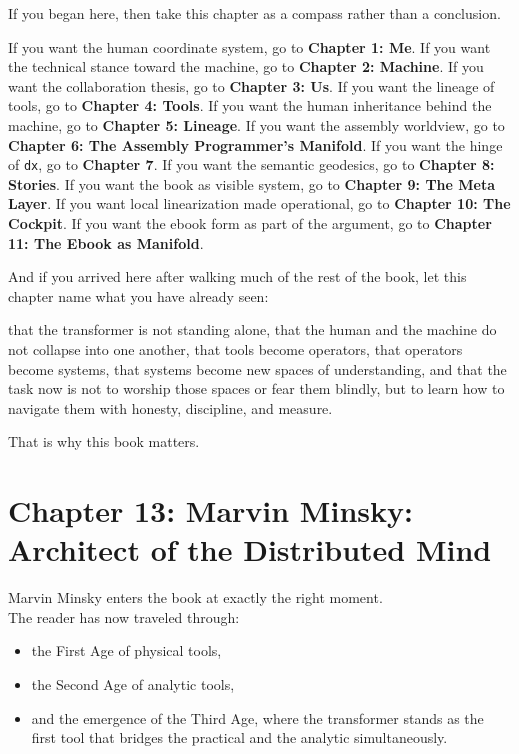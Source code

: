 If you began here, then take this chapter as a compass rather than a
conclusion.

If you want the human coordinate system, go to \textbf{Chapter 1: Me}.
If you want the technical stance toward the machine, go to
\textbf{Chapter 2: Machine}. If you want the collaboration thesis, go to
\textbf{Chapter 3: Us}. If you want the lineage of tools, go to
\textbf{Chapter 4: Tools}. If you want the human inheritance behind the
machine, go to \textbf{Chapter 5: Lineage}. If you want the assembly
worldview, go to \textbf{Chapter 6: The Assembly Programmer's Manifold}.
If you want the hinge of \texttt{dx}, go to \textbf{Chapter 7}. If you
want the semantic geodesics, go to \textbf{Chapter 8: Stories}. If you
want the book as visible system, go to \textbf{Chapter 9: The Meta
Layer}. If you want local linearization made operational, go to
\textbf{Chapter 10: The Cockpit}. If you want the ebook form as part of
the argument, go to \textbf{Chapter 11: The Ebook as Manifold}.

And if you arrived here after walking much of the rest of the book, let
this chapter name what you have already seen:

that the transformer is not standing alone, that the human and the
machine do not collapse into one another, that tools become operators,
that operators become systems, that systems become new spaces of
understanding, and that the task now is not to worship those spaces or
fear them blindly, but to learn how to navigate them with honesty,
discipline, and measure.

That is why this book matters.

\newpage
\vspace*{3cm}

\hypertarget{chapter-13-marvin-minsky-architect-of-the-distributed-mind}{%
\section{Chapter 13: Marvin Minsky: Architect of the Distributed
Mind}\label{chapter-13-marvin-minsky-architect-of-the-distributed-mind}}

Marvin Minsky enters the book at exactly the right moment.\\
The reader has now traveled through:

\begin{itemize}
\tightlist
\item
  the First Age of physical tools,
\item
  the Second Age of analytic tools,
\item
  and the emergence of the Third Age, where the transformer stands as
  the first tool that bridges the practical and the analytic
  simultaneously.
\end{itemize}

